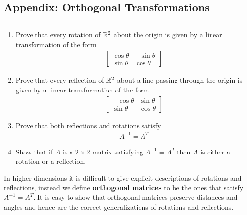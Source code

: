 \subsection{Appendix: Orthogonal Transformations}
\begin{ques}$ $
  \begin{enumerate}
    \item Prove that every rotation of $\mathbb{R}^2$ about the origin is given by a linear transformation of the form
    \begin{align*}
      \begin{bmatrix}
        \cos \theta & -\sin \theta \\
        \sin \theta & \cos \theta
      \end{bmatrix}
    \end{align*}
    \item Prove that every reflection of $\mathbb{R}^2$ about a line passing through the origin is given by a linear transformation of the form
    \begin{align*}
      \begin{bmatrix}
        -\cos \theta & \sin \theta \\
        \sin \theta & \cos \theta
      \end{bmatrix}
    \end{align*}
    \item Prove that both reflections and rotations satisfy
    \begin{align*}
      A^{-1} = A^T
    \end{align*}
    \item Show that if $A$ is a $2 \times 2$ matrix satisfying $A^{-1} = A^T$ then $A$ is either a rotation or a reflection.
  \end{enumerate}
\end{ques}
In higher dimensions it is difficult to give explicit descriptions of rotations and reflections, instead we define \textbf{orthogonal matrices} to be the ones that satisfy $A^{-1} = A^T$. It is easy to show that orthogonal matrices preserve distances and angles and hence are the correct generalizations of rotations and reflections.

